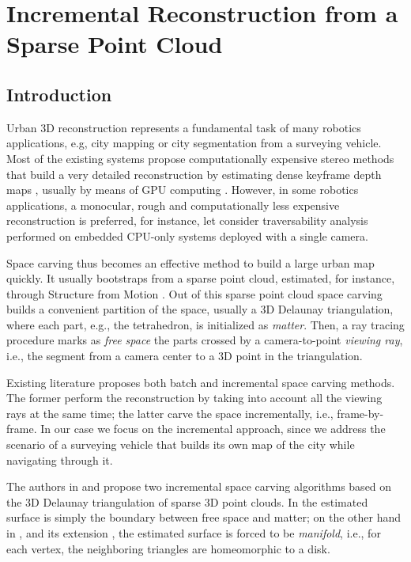 \chapter{Incremental Reconstruction from a Sparse Point Cloud}










\section{Introduction}
\label{sec:intro_ch5}
Urban 3D reconstruction represents a fundamental task of many robotics applications, e.g, city mapping \cite{Pollefeys_et_al_08} or city segmentation \cite{Hane_et_al_09} from a surveying vehicle.
Most of the existing systems propose computationally expensive stereo methods that build a very detailed reconstruction by estimating dense keyframe depth maps , usually by means of GPU computing \cite{Pollefeys_et_al_08,Cornelis_et_al08}. 
However, in some robotics applications, a monocular, rough and computationally less expensive reconstruction is preferred,  for instance, let consider traversability analysis performed on embedded CPU-only systems deployed with a single camera.

Space carving \cite{Seitz_et_al06} thus becomes an effective method to build  a large urban map quickly. 
It usually bootstraps from a sparse point cloud, estimated, for instance, through Structure from Motion \cite{Snavely_et_al06}. 
Out of this sparse point cloud space carving builds a convenient partition of the space, usually a 3D Delaunay triangulation, where each part, e.g., the tetrahedron, is initialized as \emph{matter}.
Then, a ray tracing procedure marks as \emph{free space} the parts  crossed by a camera-to-point \emph{viewing ray}, i.e., the segment from a camera center to a 3D point in the triangulation. 

Existing literature proposes both batch \cite{Pan_et_al09} and incremental \cite{litvinov_lhuillier_13,Lovi_et_al_11} space carving methods.
The former perform the reconstruction by taking into account all the viewing rays at the same time; the latter carve the space incrementally, i.e., frame-by-frame.
In our case we focus on the incremental approach, since we address the scenario of a surveying vehicle that builds its own map of the city while navigating through it.

The authors in \cite{Lovi_et_al_11}  and \cite{litvinov_lhuillier_13} propose two incremental space carving algorithms based on the 3D Delaunay triangulation of sparse 3D point clouds. 
In \cite{Lovi_et_al_11} the estimated surface is simply the boundary between free space and matter; on the other hand in \cite{litvinov_lhuillier_13}, and its extension \cite{litvinov_Lhiuller14}, the estimated surface is forced to be \emph{manifold}, i.e., for each vertex, the neighboring triangles are homeomorphic to a disk. 

